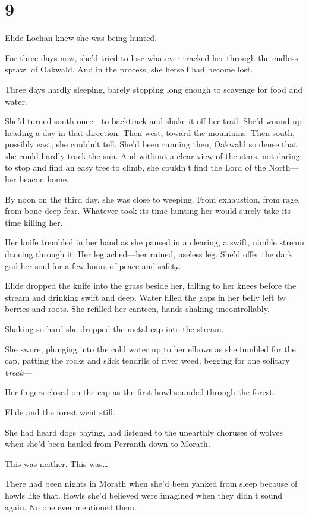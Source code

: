 
\chapter{9}

Elide Lochan knew she was being hunted.

For three days now, she'd tried to lose whatever tracked her through the endless sprawl of Oakwald. And in the process, she herself had become lost.

Three days hardly sleeping, barely stopping long enough to scavenge for food and water.

She'd turned south once---to backtrack and shake it off her trail. She'd wound up heading a day in that direction. Then west, toward the mountains. Then south, possibly east; she couldn't tell. She'd been running then, Oakwald so dense that she could hardly track the sun. And without a clear view of the stars, not daring to stop and find an easy tree to climb, she couldn't find the Lord of the North---her beacon home.

By noon on the third day, she was close to weeping. From exhaustion, from rage, from bone-deep fear. Whatever took its time hunting her would surely take its time killing her.

Her knife trembled in her hand as she paused in a clearing, a swift, nimble stream dancing through it. Her leg ached---her ruined, useless leg. She'd offer the dark god her soul for a few hours of peace and safety.

Elide dropped the knife into the grass beside her, falling to her knees before the stream and drinking swift and deep. Water filled the gaps in her belly left by berries and roots. She refilled her canteen, hands shaking uncontrollably.

Shaking so hard she dropped the metal cap into the stream.

She swore, plunging into the cold water up to her elbows as she fumbled for the cap, patting the rocks and slick tendrils of river weed, begging for one solitary \emph{break}---

Her fingers closed on the cap as the first howl sounded through the forest.

Elide and the forest went still.

She had heard dogs baying, had listened to the unearthly choruses of wolves when she'd been hauled from Perranth down to Morath.

This was neither. This was\ldots{}

There had been nights in Morath when she'd been yanked from sleep because of howls like that. Howls she'd believed were imagined when they didn't sound again. No one ever mentioned them.

